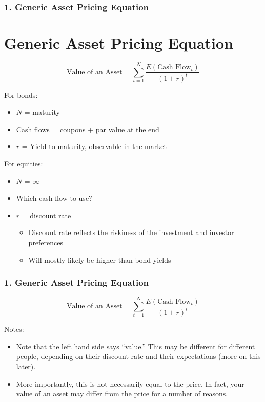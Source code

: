 \documentclass{beamer}
\begin{document}
\begin{frame}[t]
    \frametitle{1. Generic Asset Pricing Equation}
    \section{Generic Asset Pricing Equation}

    $$
    \text{Value of an Asset} = \sum_{t=1}^{N} \frac{E(\text{Cash Flow}_t)}{(1+r)^t}
    $$

    For bonds:
    \begin{itemize}
        \item $N$ = maturity
        \item Cash flows = coupons + par value at the end
        \item $r$ = Yield to maturity, observable in the market
    \end{itemize}

    For equities:
    \begin{itemize}
        \item $N$ = $\infty$
        \item Which cash flow to use?
        \item $r$ = discount rate
        \begin{itemize}
            \item Discount rate reflects the riskiness of the investment and investor preferences
            \item Will mostly likely be higher than bond yields
        \end{itemize}
    \end{itemize}
\end{frame}

\begin{frame}[t]
    \frametitle{1. Generic Asset Pricing Equation}

    $$
    \text{Value of an Asset} = \sum_{t=1}^{N} \frac{E(\text{Cash Flow}_t)}{(1+r)^t}
    $$

    Notes:
    \begin{itemize}
        \item Note that the left hand side says “value.”   This may be different for different people, depending on their discount rate and their expectations (more on this later). 
        \item More importantly, this is not necessarily equal to the price.   In fact, your value of an asset may differ from the price for a number of reasons.
    \end{itemize}


\end{frame}
\end{document}
